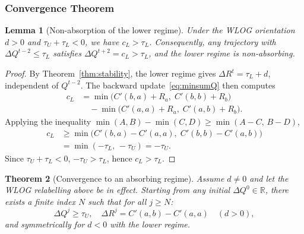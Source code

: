 \documentclass[letterpaper]{article} %
\newtheorem{theorem}{Theorem}[section]
\newtheorem{lemma}[theorem]{Lemma}
\theoremstyle{definition}
\theoremstyle{remark}
\begin{document}
\subsubsection{Convergence Theorem}
\begin{lemma}[Non-absorption of the lower regime]\label{lem:upper-nonabsorb}
Under the WLOG orientation $d > 0$ and $\tau_U + \tau_L < 0$, we have $c_L > \tau_L$.  Consequently, any trajectory with $\Delta Q^{t-2} \leq \tau_L$ satisfies $\Delta Q^{t+2} = c_L > \tau_L$, and the lower regime is non-absorbing.
\end{lemma}
\begin{proof}
By Theorem~\ref{thm:stability}, the lower regime gives $\Delta R^t = \tau_L + d$, independent of $Q^{t-2}$.  The backward update~\eqref{eq:minsumQ} then computes
\[
    \begin{aligned}
        c_L &= \min\bigl(C'(b,a)+R_a,\; C'(b,b)+R_b\bigr) \\
            &\quad - \min\bigl(C'(a,a)+R_a,\; C'(a,b)+R_b\bigr).
    \end{aligned}
\]
Applying the inequality $\min(A,B) - \min(C,D) \geq \min(A-C,\, B-D)$,
\[
    \begin{aligned}
        c_L &\geq \min\bigl(C'(b,a) - C'(a,a),\; C'(b,b) - C'(a,b)\bigr) \\
            &= \min(-\tau_L,\, -\tau_U) = -\tau_U.
    \end{aligned}
\]
Since $\tau_U + \tau_L < 0$, $-\tau_U > \tau_L$, hence $c_L > \tau_L$. \qedhere
\end{proof}
\begin{theorem}[Convergence to an absorbing regime]\label{thm:convergence}
Assume $d \neq 0$ and let the WLOG relabelling above be in effect.  Starting from any initial $\Delta Q^0 \in \mathbb{R}$, there exists a finite index $N$ such that for all $j \geq N$:
\[
    \Delta Q^j \geq \tau_U,\quad \Delta R^j = C'(a,b) - C'(a,a) \quad (d > 0),
\]
and symmetrically for $d < 0$ with the lower regime.
\end{theorem}
\end{document}
